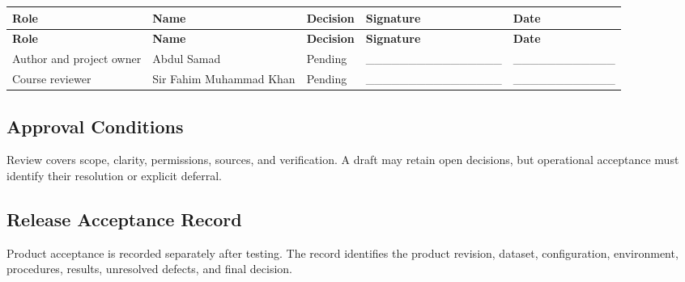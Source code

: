 \documentclass[11pt,letterpaper]{article}
\begin{document}
\begingroup\small

\begin{longtable}{|P{\arrayrulewidth\relax}|P{\arrayrulewidth\relax}|P{\arrayrulewidth\relax}|P{\arrayrulewidth\relax}|P{\arrayrulewidth\relax}|}

\hline{}

\textbf{Role} & \textbf{Name} & \textbf{Decision} & \textbf{Signature} & \textbf{Date} \\ \hline

\endfirsthead

\hline{}

\textbf{Role} & \textbf{Name} & \textbf{Decision} & \textbf{Signature} & \textbf{Date} \\ \hline

\endhead

\hline\endfoot

\hline\endlastfoot

Author and project owner & Abdul Samad & Pending & \_\_\_\_\_\_\_\_\_\_\_\_\_\_\_\_ & \_\_\_\_\_\_\_\_\_\_\_\_ \\ \hline

Course reviewer & Sir Fahim Muhammad Khan & Pending & \_\_\_\_\_\_\_\_\_\_\_\_\_\_\_\_ & \_\_\_\_\_\_\_\_\_\_\_\_ \\ \hline

\end{longtable}

\endgroup

\subsection{Approval Conditions}

Review covers scope, clarity, permissions, sources, and verification. A draft may retain open decisions, but operational acceptance must identify their resolution or explicit deferral.\par

\subsection{Release Acceptance Record}

Product acceptance is recorded separately after testing. The record identifies the product revision, dataset, configuration, environment, procedures, results, unresolved defects, and final decision.\par
\end{document}
